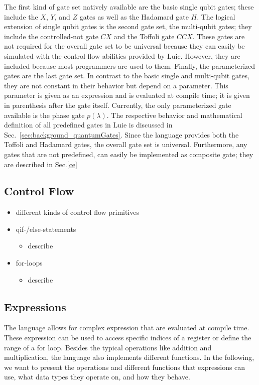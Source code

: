 The first kind of gate set natively available are the basic single qubit gates; these include the $X$, $Y$, and $Z$ gates as well as the Hadamard gate $H$. The logical extension of single qubit gates is the second gate set, the multi-qubit gates; they include the controlled-not gate $CX$ and the Toffoli gate $CCX$. These gates are not required for the overall gate set to be universal because they can easily be simulated with the control flow abilities provided by Luie. However, they are included because most programmers are used to them.
Finally, the parameterized gates are the last gate set. In contrast to the basic single and multi-qubit gates, they are not constant in their behavior but depend on a parameter. This parameter is given as an expression and is evaluated at compile time; it is given in parenthesis after the gate itself. Currently, the only parameterized gate available is the phase gate $p(\lambda)$.
The respective behavior and mathematical definition of all predefined gates in Luie is discussed in Sec.~\ref{sec:background_quantumGates}. Since the language provides both the Toffoli and Hadamard gates, the overall gate set is universal. Furthermore, any gates that are not predefined, can easily be implemented as composite gate; they are described in Sec.\ref{ce} 

\subsection{Control Flow}
\label{sec:concept_controlFlow}
\begin{itemize}
    \item different kinds of control flow primitives
    \item qif-/else-statements
    \begin{itemize}
        \item describe
    \end{itemize}
    \item for-loops
    \begin{itemize}
        \item describe
    \end{itemize}
\end{itemize}

\subsection{Expressions}
\label{sec:concept_expressions}
The language allows for complex expression that are evaluated at compile time. These expression can be used to access specific indices of a register or define the range of a for loop. Besides the typical operations like addition and multiplication, the language also implements different functions. In the following, we want to present the operations and different functions that expressions can use, what data types they operate on, and how they behave. 

